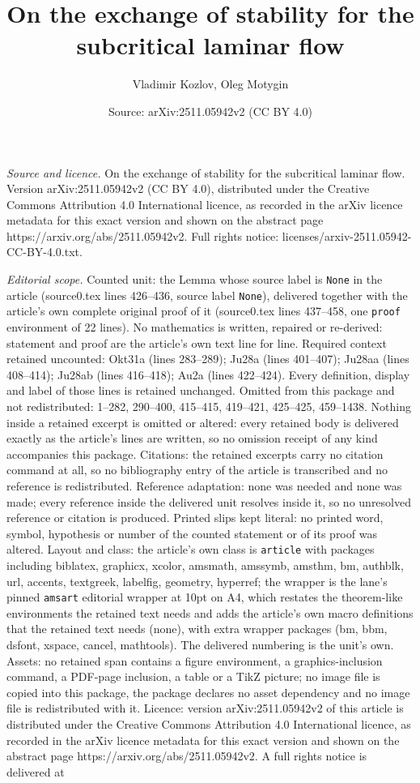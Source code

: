 \documentclass[10pt,a4paper]{amsart}
\title[On the exchange of stability for the subcritical laminar flo]{On the exchange of stability for the subcritical laminar flow}
\author{Vladimir Kozlov, Oleg Motygin}
\date{Source: arXiv:2511.05942v2 (CC BY 4.0)}
\begin{document}
\maketitle

\noindent\emph{Source and licence.} On the exchange of stability for the subcritical laminar flow. Version arXiv:2511.05942v2 (CC BY 4.0), distributed under the Creative Commons Attribution 4.0 International licence, as recorded in the arXiv licence metadata for this exact version and shown on the abstract page https://arxiv.org/abs/2511.05942v2. Full rights notice: licenses/arxiv-2511.05942-CC-BY-4.0.txt.\par\smallskip

\noindent\textit{Editorial scope.} Counted unit: the Lemma whose source label is \texttt{None} in the article (source0.tex lines 426--436, source label \texttt{None}), delivered together with the article's own complete original proof of it (source0.tex lines 437--458, one \texttt{proof} environment of 22 lines). No mathematics is written, repaired or re-derived: statement and proof are the article's own text line for line. Required context retained uncounted: Okt31a (lines 283--289); Ju28a (lines 401--407); Ju28aa (lines 408--414); Ju28ab (lines 416--418); Au2a (lines 422--424). Every definition, display and label of those lines is retained unchanged. Omitted from this package and not redistributed: 1--282, 290--400, 415--415, 419--421, 425--425, 459--1438. Nothing inside a retained excerpt is omitted or altered: every retained body is delivered exactly as the article's lines are written, so no omission receipt of any kind accompanies this package. Citations: the retained excerpts carry no citation command at all, so no bibliography entry of the article is transcribed and no reference is redistributed. Reference adaptation: none was needed and none was made; every reference inside the delivered unit resolves inside it, so no unresolved reference or citation is produced. Printed slips kept literal: no printed word, symbol, hypothesis or number of the counted statement or of its proof was altered. Layout and class: the article's own class is \texttt{article} with packages including biblatex, graphicx, xcolor, amsmath, amssymb, amsthm, bm, authblk, url, accents, textgreek, labelfig, geometry, hyperref; the wrapper is the lane's pinned \texttt{amsart} editorial wrapper at 10pt on A4, which restates the theorem-like environments the retained text needs and adds the article's own macro definitions that the retained text needs (none), with extra wrapper packages (bm, bbm, dsfont, xspace, cancel, mathtools). The delivered numbering is the unit's own. Assets: no retained span contains a figure environment, a graphics-inclusion command, a PDF-page inclusion, a table or a TikZ picture; no image file is copied into this package, the package declares no asset dependency and no image file is redistributed with it. Licence: version arXiv:2511.05942v2 of this article is distributed under the Creative Commons Attribution 4.0 International licence, as recorded in the arXiv licence metadata for this exact version and shown on the abstract page https://arxiv.org/abs/2511.05942v2. A full rights notice is delivered at 
\end{document}
